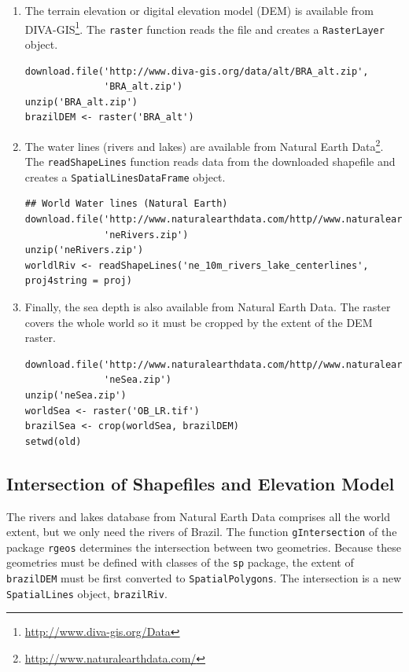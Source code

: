 \documentclass[smallroyalvopaper]{memoir}
\begin{document}
\begin{enumerate}
\item The terrain elevation or digital elevation model (DEM) is
available from DIVA-GIS\footnote{\url{http://www.diva-gis.org/Data}}. The \texttt{raster} function reads the
file and creates a \texttt{RasterLayer} object.
\lstset{language=R,numbers=none}
\begin{lstlisting}
download.file('http://www.diva-gis.org/data/alt/BRA_alt.zip',
              'BRA_alt.zip')
unzip('BRA_alt.zip')
brazilDEM <- raster('BRA_alt')
\end{lstlisting}
\item The water lines (rivers and lakes) are available from Natural
Earth Data\footnote{\url{http://www.naturalearthdata.com/}}. The \texttt{readShapeLines} function reads data from
the downloaded shapefile and creates a \texttt{SpatialLinesDataFrame}
object.
\lstset{language=R,numbers=none}
\begin{lstlisting}
## World Water lines (Natural Earth)
download.file('http://www.naturalearthdata.com/http//www.naturalearthdata.com/download/10m/physical/ne_10m_rivers_lake_centerlines.zip',
              'neRivers.zip')
unzip('neRivers.zip')
worldlRiv <- readShapeLines('ne_10m_rivers_lake_centerlines', proj4string = proj)
\end{lstlisting}
\item Finally, the sea depth is also available from Natural Earth
Data\footnotemark[5]{}. The raster covers the whole world so it must be
cropped by the extent of the DEM raster.
\lstset{language=R,numbers=none}
\begin{lstlisting}
download.file('http://www.naturalearthdata.com/http//www.naturalearthdata.com/download/10m/raster/OB_LR.zip',
              'neSea.zip')
unzip('neSea.zip')
worldSea <- raster('OB_LR.tif')
brazilSea <- crop(worldSea, brazilDEM)
setwd(old)
\end{lstlisting}
\end{enumerate}
\subsection{Intersection of Shapefiles and Elevation Model}
\label{sec-1-2}
The rivers and lakes database from Natural Earth Data comprises all
the world extent, but we only need the rivers of Brazil. The function
\texttt{gIntersection} of the package \texttt{rgeos} determines the intersection
between two geometries. Because these geometries must be defined with
classes of the \texttt{sp} package, the extent of \texttt{brazilDEM} must be first
converted to \texttt{SpatialPolygons}. The intersection is a new
\texttt{SpatialLines} object, \texttt{brazilRiv}.
\end{document}
